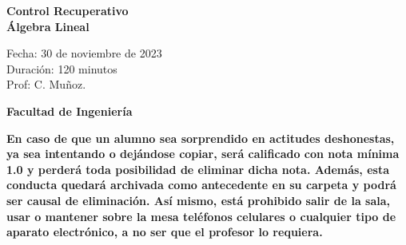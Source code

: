 \documentclass[a4paper]{article}
\begin{document}
\thispagestyle{fancy}
\vspace*{1cm}

\begin{minipage}[r]{12cm}
    \begin{flushright}
    \end{flushright}
\end{minipage}

\begin{center}
\Large{\textbf{Control Recuperativo \\\'Algebra Lineal\\  }}
\end{center}
\vspace{1cm}
\begin{minipage}[r]{15cm}
\begin{flushleft}

Fecha: 30 de noviembre de 2023 \\%
Duración: 120 minutos  \\
Prof: C. Muñoz.\\

\end{flushleft}
\end{minipage}
\vspace{2cm}
\begin{center}
\Large{\textbf{Facultad de Ingeniería}}
\end{center}
\vspace{1cm}
\textbf{En caso de que un alumno sea sorprendido en actitudes deshonestas, ya sea intentando o
dejándose copiar, será calificado con nota mínima 1.0 y perderá toda posibilidad de eliminar
dicha nota. Además, esta conducta quedará archivada como antecedente en su carpeta y
podrá ser causal de eliminación.
Así mismo, está prohibido salir de la sala, usar o mantener sobre la mesa teléfonos celulares
o cualquier tipo de aparato electrónico, a no ser que el profesor lo requiera.}\\



\vspace{3cm}
\newpage
\end{document}
